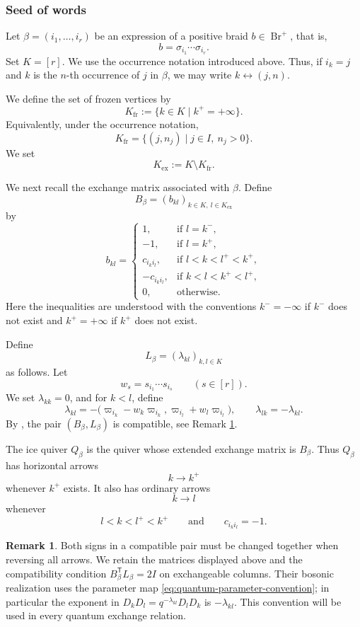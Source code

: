 \documentclass[12pt, reqno]{amsart}
\theoremstyle{plain}
\theoremstyle{definition}
\newtheorem{remark}[theorem]{Remark}
\numberwithin{equation}{section}
\newcommand{\Br}{{\operatorname{Br}}}
\begin{document}
\subsubsection{Seed of words}\label{subsec:seed_words}

Let \(\beta=(i_1,\dots,i_r)\) be an expression of a positive braid
\(b\in \Br^+\), that is,
\[
b=\sigma_{i_1}\cdots \sigma_{i_r}.
\]
Set \(K=[r]\). We use the occurrence notation introduced above. Thus, if
\(i_k=j\) and \(k\) is the \(n\)-th occurrence of \(j\) in \(\beta\), we may
write \(k\leftrightarrow(j,n)\).

We define the set of frozen vertices by
\[
K_{\mathrm{fr}}
:=
\{k\in K\mid k^+=+\infty\}.
\]
Equivalently, under the occurrence notation,
\[
K_{\mathrm{fr}}
=
\{(j,n_j)\mid j\in I,\ n_j>0\}.
\]
We set
\[
K_{\mathrm{ex}}:=K\setminus K_{\mathrm{fr}}.
\]

We next recall the exchange matrix associated with \(\beta\). Define
\[
B_{\beta}=(b_{kl})_{k\in K,\ l\in K_{\mathrm{ex}}}
\]
by
\begin{equation}
\label{eq_braidmatrix}
b_{kl}=
\begin{cases}
1,
& \text{if } l=k^-,
\\
-1,
& \text{if } l=k^+,
\\
c_{i_k i_l},
& \text{if } l<k<l^+<k^+,
\\
-c_{i_k i_l},
& \text{if } k<l<k^+<l^+,
\\
0,
& \text{otherwise}.
\end{cases}
\end{equation}
Here the inequalities are understood with the conventions
\(k^-=-\infty\) if \(k^-\) does not exist and \(k^+=+\infty\) if \(k^+\)
does not exist.

Define
\[
L_\beta=(\lambda_{kl})_{k,l\in K}
\]
as follows. Let
\[
w_s=s_{i_1}\cdots s_{i_s}
\qquad (s\in [r]).
\]
We set \(\lambda_{kk}=0\), and for \(k<l\), define
\[
\lambda_{kl}
=
-\bigl(
\varpi_{i_k}-w_k\varpi_{i_k},
\varpi_{i_l}+w_l\varpi_{i_l}
\bigr),
\qquad
\lambda_{lk}=-\lambda_{kl}.
\]
By \cite[Proposition~1.2]{fujita2023isomorphisms},  the pair
\((B_\beta,L_\beta)\) is compatible, see Remark \ref{rem_BGLS}.

The ice quiver \(Q_\beta\) is the quiver whose extended exchange matrix is
\(B_\beta\). Thus \(Q_\beta\) has horizontal arrows
\[
k\longrightarrow k^+
\]
whenever \(k^+\) exists. It also has ordinary arrows
\[
k\longrightarrow l
\]
whenever
\[
l<k<l^+<k^+
\qquad\text{and}\qquad
c_{i_k i_l}=-1.
\]
\begin{remark}
\label{rem_BGLS}
Both signs in a compatible pair must be changed together when reversing
all arrows. We retain the matrices displayed above and the compatibility
condition \(B_\beta^{\mathsf T}L_\beta=2I\) on exchangeable columns.
Their bosonic realization uses the parameter map
\eqref{eq:quantum-parameter-convention}; in particular the exponent in
\(D_kD_l=q^{-\lambda_{kl}}D_lD_k\) is \(-\lambda_{kl}\).
This convention will be used in every quantum exchange relation.
\end{remark}
\end{document}
